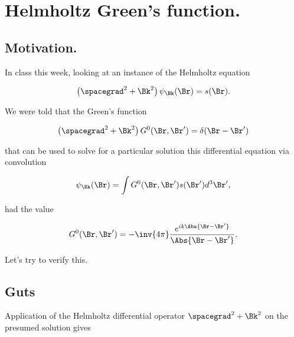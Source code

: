 
%

\chapter{Helmholtz Green's function.}
\label{chap:helmholtzGreens}
{}
\date{Dec 12, 2011}

\beginArtWithToc

\section{Motivation.}

In class this week, looking at an instance of the Helmholtz equation

\begin{equation}\label{eqn:helmholtzGreens:10}
\left( \spacegrad^2 + \Bk^2\right) \psi_\Bk(\Br) = s(\Br).
\end{equation}

We were told that the Green's function

\begin{equation}\label{eqn:helmholtzGreens:30}
\left( \spacegrad^2 + \Bk^2\right) G^0(\Br, \Br') = \delta(\Br- \Br')
\end{equation}

that can be used to solve for a particular solution this differential equation via convolution

\begin{equation}\label{eqn:helmholtzGreens:50}
\psi_\Bk(\Br) = \int G^0(\Br, \Br') s(\Br') d^3 \Br',
\end{equation}

had the value

\begin{equation}\label{eqn:helmholtzGreens:70}
G^0(\Br, \Br') = - \inv{4 \pi} \frac{e^{i k \Abs{\Br - \Br'}} }{\Abs{\Br - \Br'}}.
\end{equation}

Let's try to verify this.

\section{Guts}

Application of the Helmholtz differential operator $\spacegrad^2 + \Bk^2$ on the presumed solution gives

